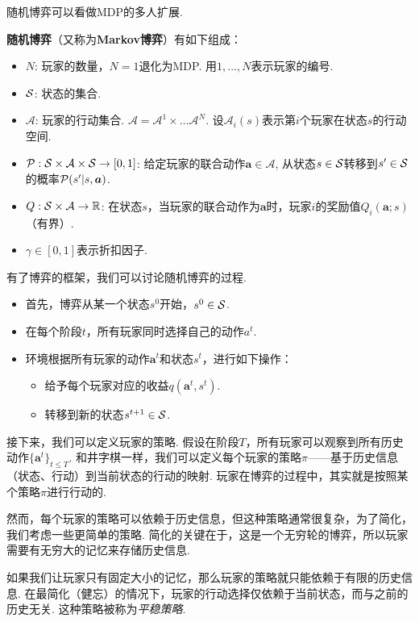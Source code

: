 随机博弈可以看做MDP的多人扩展. 

\begin{definition}
\textbf{随机博弈}（又称为\textbf{Markov博弈}）有如下组成：
\begin{itemize}
\item $N$: 玩家的数量，$N=1$退化为MDP. 用$1,\dots,N$表示玩家的编号.
\item $\mathcal S$: 状态的集合.
\item $\mathcal A$: 玩家的行动集合. $\mathcal A=\mathcal A^1\times \dots\mathcal A^N$. 设$\mathcal A_i(s)$表示第$i$个玩家在状态$s$的行动空间.
\item $\mathcal P: \mathcal S\times \mathcal A\times \mathcal S\to [0,1]$: 给定玩家的联合动作$\boldsymbol a\in\mathcal A$, 从状态$s\in \mathcal S$转移到$s'\in \mathcal S$的概率$\mathcal P(s'|s,\boldsymbol a)$.
\item $Q: \mathcal S\times \mathcal A\to \mathbb{R}$: 在状态$s$，当玩家的联合动作为$\boldsymbol a$时，玩家$i$的奖励值$Q_i(\boldsymbol a;s)$（有界）.
\item $\gamma\in[0,1]$表示折扣因子.
\end{itemize}
\end{definition}

有了博弈的框架，我们可以讨论随机博弈的过程. 
\begin{itemize}
    \item 首先，博弈从某一个状态$s^0$开始，$s^0\in \mathcal S$.
    \item 在每个阶段$t$，所有玩家同时选择自己的动作$a^t$.
    \item 环境根据所有玩家的动作$\boldsymbol a^t$和状态$s^t$，进行如下操作：
    \begin{itemize}
        \item 给予每个玩家对应的收益$q(\boldsymbol a^t, s^t)$.
        \item 转移到新的状态$s^{t+1}\in \mathcal S$.
    \end{itemize}
\end{itemize}
    
接下来，我们可以定义玩家的策略. 假设在阶段$T$，所有玩家可以观察到所有历史动作$\{\boldsymbol a^t\}_{t\leq T}$. 和井字棋一样，我们可以定义每个玩家的策略$\pi$——基于历史信息（状态、行动）到当前状态的行动的映射. 玩家在博弈的过程中，其实就是按照某个策略$\pi$进行行动的. 

然而，每个玩家的策略可以依赖于历史信息，但这种策略通常很复杂，为了简化，我们考虑一些更简单的策略. 简化的关键在于，这是一个无穷轮的博弈，所以玩家需要有无穷大的记忆来存储历史信息. 

如果我们让玩家只有固定大小的记忆，那么玩家的策略就只能依赖于有限的历史信息. 在最简化（健忘）的情况下，玩家的行动选择仅依赖于当前状态，而与之前的历史无关. 这种策略被称为\textit{平稳策略}.

